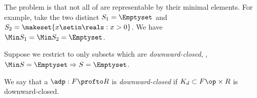 The problem is that not all  of \posA are representable by their minimal elements.
For example, take the two distinct  $S_1 = \Emptyset$ and $S_2 = \makeset{x \setin \reals : x > 0}$.
We have $\Min S_1 = \Min S_2 = \Emptyset$.

Suppose we restrict to only subsets which are \emph{downward-closed}, \ie,  $\Min S = \Emptyset \Rightarrow S = \Emptyset$.





We say that a  $\adp : F \profto R$ is \emph{downward-closed} if $K_d \subset F\op \times R$ is downward-closed.


